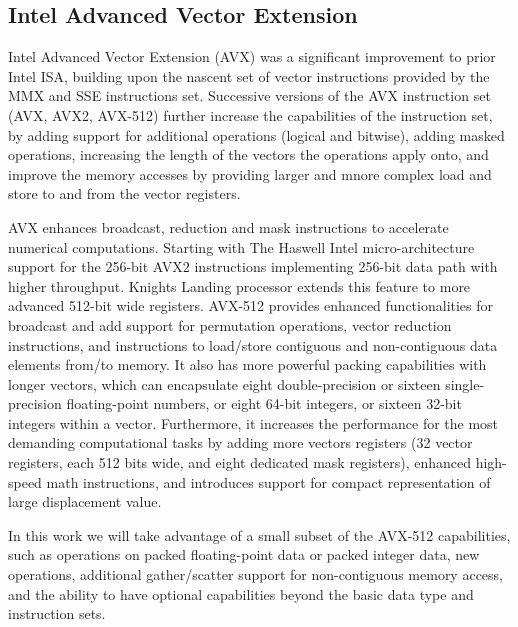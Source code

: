 \documentclass[conference]{IEEEtran}
\begin{document}
\subsection{Intel Advanced Vector Extension}

Intel Advanced Vector Extension (AVX) was a significant improvement to prior
Intel ISA, building upon the nascent set of vector instructions provided by the
MMX and SSE instructions set. Successive versions of the AVX instruction set
(AVX, AVX2, AVX-512) further increase the capabilities of the instruction set,
by adding support for additional operations (logical and bitwise), adding masked
operations, increasing the length of the vectors the operations apply onto, and
improve the memory accesses by providing larger and mnore complex load and store
to and from the vector registers.

AVX enhances broadcast, reduction and mask instructions to accelerate numerical
computations. Starting with The Haswell Intel micro-architecture support for the
256-bit AVX2 instructions implementing 256-bit data path with higher throughput.
Knights Landing processor extends this feature to more advanced 512-bit wide
registers.
%
AVX-512 provides enhanced functionalities for broadcast and add support for
permutation operations, vector reduction instructions, and instructions to
load/store contiguous and non-contiguous data elements from/to memory. It also
has more powerful packing capabilities with longer vectors, which can
encapsulate eight double-precision or sixteen single-precision floating-point
numbers, or eight 64-bit integers, or sixteen 32-bit integers within a vector.
Furthermore, it increases the performance for the most demanding computational
tasks by adding more vectors registers (32 vector registers, each 512 bits wide,
and eight dedicated mask registers), enhanced high-speed math instructions, and
introduces support for compact representation of large displacement value.

In this work we will take advantage of a small subset of the AVX-512
capabilities,
such as operations on packed floating-point data or packed integer data, new
operations, additional gather/scatter support for non-contiguous memory access,
and the ability to have optional capabilities beyond the basic data type and
instruction sets.
\end{document}
